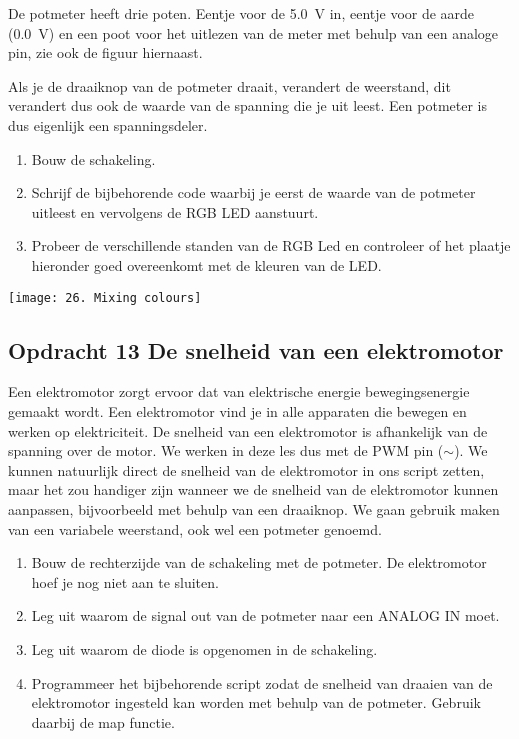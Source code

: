 \documentclass{arduino}
\begin{document}
De potmeter heeft drie poten. Eentje voor de \SI{5.0}{\volt} in, eentje voor de aarde (\SI{0.0}{\volt}) en een poot voor het uitlezen van de meter met behulp van een analoge pin, zie ook de figuur hiernaast.

Als je de draaiknop van de potmeter draait, verandert de weerstand, dit verandert dus ook de waarde van de spanning die je uit leest. Een potmeter is dus eigenlijk een spanningsdeler.

\begin{enumerate}[label={\alph*})]
\item Bouw de schakeling.

\item Schrijf de bijbehorende code waarbij je eerst de waarde van de potmeter uitleest en vervolgens de RGB LED aanstuurt.

\item Probeer de verschillende standen van de RGB Led en controleer of het plaatje hieronder goed overeenkomt met de kleuren van de LED.
\end{enumerate}

\begin{center}
\texttt{[image: 26. Mixing colours]}
\end{center}

\newpage

\subsection{Opdracht 13 De snelheid van een elektromotor}



Een elektromotor zorgt ervoor dat van elektrische energie bewegingsenergie gemaakt wordt. Een elektromotor vind je in alle apparaten die bewegen en werken op elektriciteit. De snelheid van een elektromotor is afhankelijk van de spanning over de motor. We werken in deze les dus met de PWM pin ($\sim$). We kunnen natuurlijk direct de snelheid van de elektromotor in ons script zetten, maar het zou handiger zijn wanneer we de snelheid van de elektromotor kunnen aanpassen, bijvoorbeeld met behulp van een draaiknop. We gaan gebruik maken van een variabele weerstand, ook wel een potmeter genoemd.

\begin{enumerate}[label={\alph*})]
\item Bouw de rechterzijde van de schakeling met de potmeter. De elektromotor hoef je nog niet aan te sluiten.

\item Leg uit waarom de signal out van de potmeter naar een ANALOG IN moet.

\item Leg uit waarom de diode is opgenomen in de schakeling.

\item Programmeer het bijbehorende script zodat de snelheid van draaien van de elektromotor ingesteld kan worden met behulp van de potmeter. Gebruik daarbij de map functie.
\end{enumerate}
\end{document}
